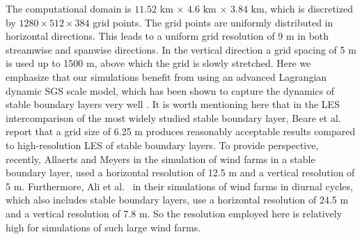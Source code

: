\documentclass[%
 aip,
 amsmath,amssymb,
reprint,
twocolumn,%
author-numerical,%
]{revtex4-1}
\begin{document}
{\color{black} \indent The computational domain is $11.52$ $\text{km}$ $\times$ $4.6$ $\text{km}$ $\times$ $3.84$ $\text{km}$, which is discretized by $1280\times512\times384$ grid points. The grid points are uniformly distributed in horizontal directions. This leads to a uniform grid resolution of 9 m in both streamwise and spanwise directions. In the vertical direction a grid spacing of 5 m is used up to 1500 m, above which the grid is slowly stretched. Here we emphasize that our simulations benefit from using an advanced Lagrangian dynamic SGS scale model, which has been shown to capture the dynamics of stable boundary layers very well \cite{sto08, nag19}. It is worth mentioning here that in the LES intercomparison of the most widely studied stable boundary layer, Beare et al.\ \cite{bea06} report that a grid size of 6.25 m produces reasonably acceptable results compared to high-resolution LES of stable boundary layers. To provide perspective, recently, Allaerts and Meyers \cite{all18} in the simulation of wind farms in a stable boundary layer, used a horizontal resolution of 12.5 m and a vertical resolution of 5 m. Furthermore, Ali et al.\ \cite{ali17} in their simulations of wind farms in diurnal cycles, which also includes stable boundary layers, use a horizontal resolution of 24.5 m and a vertical resolution of 7.8 m. So the resolution employed here is relatively high for simulations of such large wind farms.}\\
\\
\end{document}
